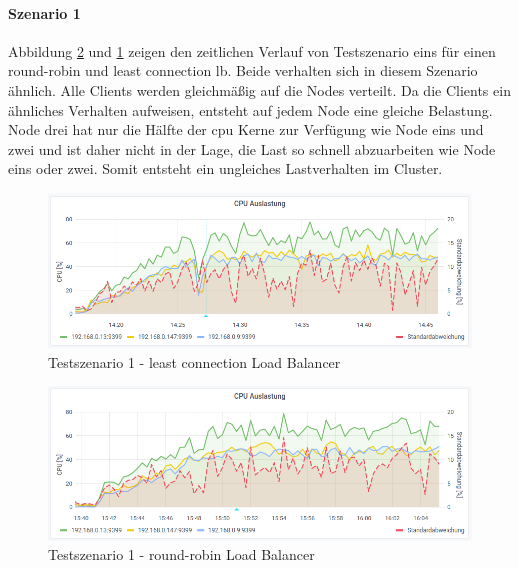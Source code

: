 \paragraph{Szenario 1}
Abbildung \ref{fig:s1-rr} und \ref{fig:s1-lc} zeigen den zeitlichen Verlauf von Testszenario eins für einen round-robin und least connection \acl{lb}.
Beide verhalten sich in diesem Szenario ähnlich. Alle Clients werden gleichmä{\ss}ig auf die Nodes verteilt.
Da die Clients ein ähnliches Verhalten aufweisen, entsteht auf jedem Node eine gleiche Belastung. Node drei hat nur die Hälfte der \ac{cpu} Kerne zur Verfügung wie Node eins und zwei und ist daher nicht in der Lage, die Last so schnell abzuarbeiten wie Node eins oder zwei. Somit entsteht ein ungleiches Lastverhalten im Cluster.
\begin{figure}
    \centering
    \includegraphics[scale=0.8]{images/s1_lc.png}
    \caption{Testszenario 1 - least connection Load Balancer}
    \label{fig:s1-lc}
\end{figure}
\begin{figure}
    \centering
    \includegraphics[scale=0.8]{images/s1_rr.png}
    \caption{Testszenario 1 - round-robin Load Balancer}
    \label{fig:s1-rr}
\end{figure}

